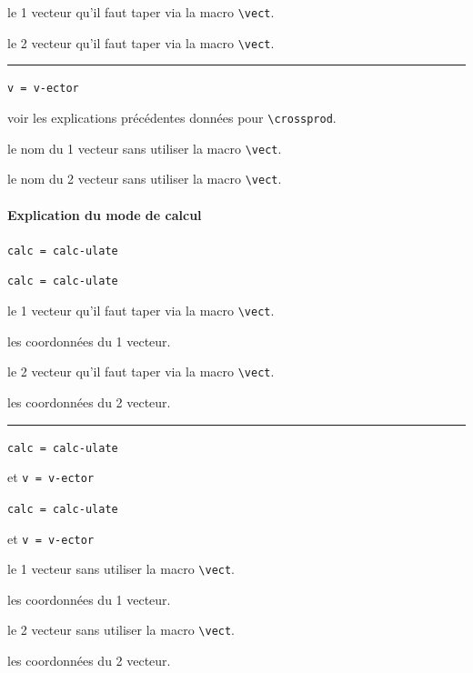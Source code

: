 \documentclass[12pt,a4paper]{book}
\newcommand\env[1]{\texttt{#1}}
\newcommand\macro[1]{\env{\textbackslash{}#1}}
\theoremstyle{definition}
\newcommand\separation{
	\medskip
	\hfill\rule{0.5\textwidth}{0.75pt}\hfill
	\medskip
}
\newcommand\mwhyprefix[2]{%
	\texttt{#1 = #1-#2}%
}
\begin{document}
{{\begin{enumerate}
\end{enumerate}

 le 1\ier{} vecteur qu'il faut taper via la macro \macro{vect}.

 le 2\ieme{} vecteur qu'il faut taper via la macro \macro{vect}.


\separation


 \hfill \mwhyprefix{v}{ector}

\IDoption{} voir les explications précédentes données pour \macro{crossprod}.

 le nom du 1\ier{} vecteur sans utiliser la macro \macro{vect}.

 le nom du 2\ieme{} vecteur sans utiliser la macro \macro{vect}.




\paragraph{Explication du mode de calcul}



  \hfill \mwhyprefix{calc}{ulate}

  \hfill \mwhyprefix{calc}{ulate}

 le 1\ier{} vecteur qu'il faut taper via la macro \macro{vect}.

 les coordonnées du 1\ier{} vecteur.

 le 2\ieme{} vecteur qu'il faut taper via la macro \macro{vect}.

 les coordonnées du 2\ieme{} vecteur.


\separation


  \hfill \mwhyprefix{calc}{ulate}
                                    et \mwhyprefix{v}{ector}

  \hfill \mwhyprefix{calc}{ulate}
                                    et \mwhyprefix{v}{ector}

 le 1\ier{} vecteur sans utiliser la macro \macro{vect}.

 les coordonnées du 1\ier{} vecteur.

 le 2\ieme{} vecteur sans utiliser la macro \macro{vect}.

 les coordonnées du 2\ieme{} vecteur.



}}
\end{document}
